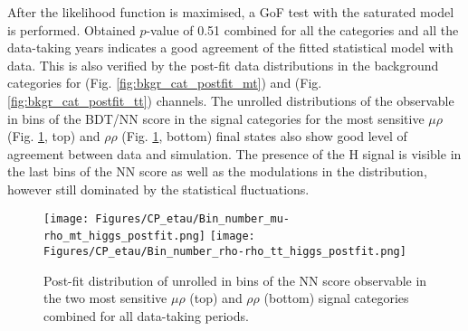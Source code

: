 After the likelihood function is maximised, a GoF test with the saturated model is performed. Obtained $p$-value of 0.51 combined for all the categories and all the data-taking years indicates a good agreement of the fitted statistical model with data. This is also verified by the post-fit data distributions in the background categories for \mt (Fig. \ref{fig:bkgr_cat_postfit_mt}) and \tata (Fig. \ref{fig:bkgr_cat_postfit_tt}) channels. The unrolled distributions of the \phicp observable in bins of the BDT/NN score in the signal categories for the most sensitive $\mu\rho$ (Fig. \ref{fig:sig_cat_postfit_comb}, top) and $\rho\rho$ (Fig. \ref{fig:sig_cat_postfit_comb}, bottom) final states also show good level of agreement between data and simulation. The presence of the H signal is visible in the last bins of the NN score as well as the modulations in the distribution, however still dominated by the statistical fluctuations.

\begin{figure}[h!]
    \centering
    \texttt{[image: Figures/CP\_etau/Bin\_number\_mu-rho\_mt\_higgs\_postfit.png]}
    \texttt{[image: Figures/CP\_etau/Bin\_number\_rho-rho\_tt\_higgs\_postfit.png]}
    \caption{Post-fit distribution of unrolled in bins of the NN score \phicp observable in the two most sensitive $\mu\rho$ (top) and $\rho\rho$ (bottom) signal categories combined for all data-taking periods.}
    \label{fig:sig_cat_postfit_comb}
\end{figure}

